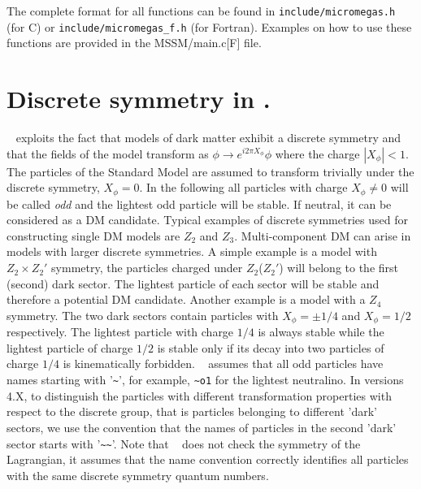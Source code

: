 \documentclass[12pt,a4paper]{article}
\begin{document}
The complete format  for all functions can be found in
\verb|include/micromegas.h| (for C) or
\verb|include/micromegas_f.h| (for Fortran). Examples on how to use these functions are provided   
in the MSSM/main.c[F] file. 
 
\section{Discrete symmetry in \micro.}

 \micro~ exploits the fact that models of dark matter exhibit a discrete symmetry
and that the fields  of the model transform as 
$   \phi \to e^{i2\pi X_{\phi}} \phi$
where the charge $|X_{\phi}|<1$. 
The particles of the  Standard Model 
are assumed to transform trivially under the discrete symmetry, $X_\phi=0$. In the following all particles with
 charge $X_\phi\neq 0$  will be called 
 {\it odd} and the  lightest odd particle  will be  stable. If neutral, it can be considered as a DM candidate.
Typical  examples  of discrete symmetries used for constructing single DM models  are $Z_2$ and  $Z_3$. 
Multi-component DM can arise in models with larger discrete symmetries. A simple 
example is a model with  $Z_2\times Z_2'$ symmetry, the particles charged under  $Z_2$($Z_2'$) will belong to the first (second) dark sector. The lightest particle of each sector  will be stable and therefore a potential DM candidate. 
Another example is a model with a $Z_4$  symmetry.  The two dark sectors contain particles with $X_\phi=\pm 1/4$ and $X_\phi=1/2$ respectively. The lightest particle with  charge $1/4$ is always stable while the lightest particle of charge $1/2$ is stable only if its decay into two particles of charge $1/4$ is kinematically forbidden.
 \micro~ assumes that all odd particles have  names
starting with '\verb|~|', for example, \verb|~o1| for the lightest  
neutralino. In versions 4.X, to distinguish the particles with different transformation properties with 
respect to the discrete group, that is particles belonging to different 'dark' sectors,
we use the convention that the names of particles in the second 'dark' sector starts with '\verb|~~|'. 
Note that \micro~ does not check the symmetry of the Lagrangian, it assumes that the name convention 
correctly identifies  all particles with the same discrete symmetry quantum numbers.

  
\end{document}
